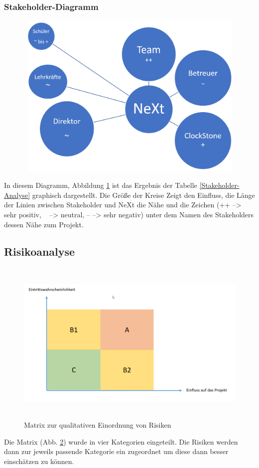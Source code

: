 \subsubsection{Stakeholder-Diagramm}
\begin{figure}[H]
	\centering
	\includegraphics[width=16cm,height=8cm]{images/Projektumfeldanalyse.png}
	\label{Stakeholder-Diagramm}
\end{figure}
	In diesem Diagramm, Abbildung \ref{Stakeholder-Diagramm} ist das Ergebnis der Tabelle \ref{Stakeholder-Analyse} graphisch dargestellt. Die Größe der Kreise Zeigt den Einfluss, die Länge der Linien zwischen Stakeholder und NeXt die Nähe und die Zeichen (++ --> sehr positiv, ~ --> neutral, -- --> sehr negativ) unter dem Namen des Stakeholders dessen Nähe zum Projekt. 

\subsection{Risikoanalyse}
\begin{figure}[H]
	\centering
	\includegraphics[width=16cm,height=8cm]{images/Risiko-Matrix.png}
	\caption{Matrix zur qualitativen Einordnung von Risiken}
	\label{MatrixRisiken}
\end{figure}
 Die Matrix (Abb. \ref{MatrixRisiken}) wurde in vier Kategorien eingeteilt. Die Risiken werden dann zur jeweils passende Kategorie ein zugeordnet um diese dann besser einschätzen zu können.\cite[S. 141 -142]{SystemplanungundProjektmanagement-Lehrbuch}

